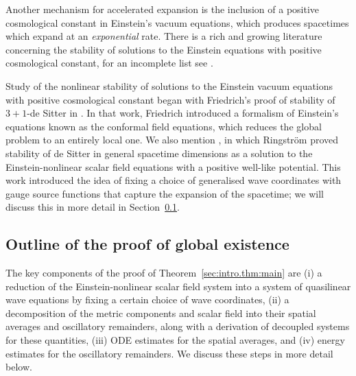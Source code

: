 \documentclass{article}
\begin{document}
Another mechanism for accelerated expansion is the inclusion of a positive cosmological constant in Einstein's vacuum equations, which produces spacetimes which expand at an \emph{exponential} rate. There is a rich and growing literature concerning the stability of solutions to the Einstein equations with positive cosmological constant, for an incomplete list see \cite{Fri:deSitterMaxwellstab:91,And:deSitteroddstab:04,LubKro:deSitterradstab11,RodSpe:irrEulerdeSitterstab:13, Spe:EulerdeSitterstab:12, HadSpe:deSitterduststab:15, Oli:EulerdeSitterstab:16,HinVas:KdSstationarystab:18,Fou:FLRWscalar:22,Fan:KdSstationarystab:25,FouMarOli:tiltedfluids:24,FouSch:KdSexpandingstab:24,HinVas:KdSexpandingstab:24,Cic:deSitterscat:24}. 

Study of the nonlinear stability of solutions to the Einstein vacuum equations with positive cosmological constant began with Friedrich's proof of stability of $3+1$-de Sitter in \cite{Fri:deSitterstab:86}. In that work, Friedrich introduced a formalism of Einstein's equations known as the conformal field equations, which reduces the global problem to an entirely local one. We also mention \cite{Rin:deSitterENSFstab08}, in which Ringstr\"om proved stability of de Sitter in general spacetime dimensions as a solution to the Einstein-nonlinear scalar field equations with a positive well-like potential. This work introduced the idea of fixing a choice of generalised wave coordinates with gauge source functions that capture the expansion of the spacetime; we will discuss this in more detail in Section~\ref{sec:intro.subsec:proof}.
\subsection{Outline of the proof of global existence }\label{sec:intro.subsec:proof}
The key components of the proof of Theorem~\ref{sec:intro.thm:main} are (i) a reduction of the Einstein-nonlinear scalar field system into a system of quasilinear wave equations by fixing a certain choice of wave coordinates, (ii) a decomposition of the metric components and scalar field into their spatial averages and oscillatory remainders, along with a derivation of decoupled systems for these quantities, (iii) ODE estimates for the spatial averages, and (iv) energy estimates for the oscillatory remainders. We discuss these steps in more detail below.
\end{document}
